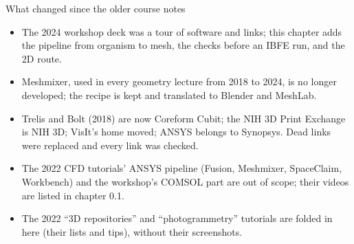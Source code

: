 \documentclass[aspectratio=169,11pt]{beamer}
\begin{document}
\begin{frame}{What changed since the older course notes}
\begin{itemize}
  \item The 2024 workshop deck was a tour of software and links; this chapter adds the pipeline from organism to mesh, the checks before an IBFE run, and the 2D route.
  \item Meshmixer, used in every geometry lecture from 2018 to 2024, is no longer developed; the recipe is kept and translated to Blender and MeshLab.
  \item Trelis and Bolt (2018) are now Coreform Cubit; the NIH 3D Print Exchange is NIH 3D; VisIt's home moved; ANSYS belongs to Synopsys. Dead links were replaced and every link was checked.
  \item The 2022 CFD tutorials' ANSYS pipeline (Fusion, Meshmixer, SpaceClaim, Workbench) and the workshop's COMSOL part are out of scope; their videos are listed in chapter 0.1.
  \item The 2022 ``3D repositories'' and ``photogrammetry'' tutorials are folded in here (their lists and tips), without their screenshots.
\end{itemize}
\end{frame}
\end{document}
